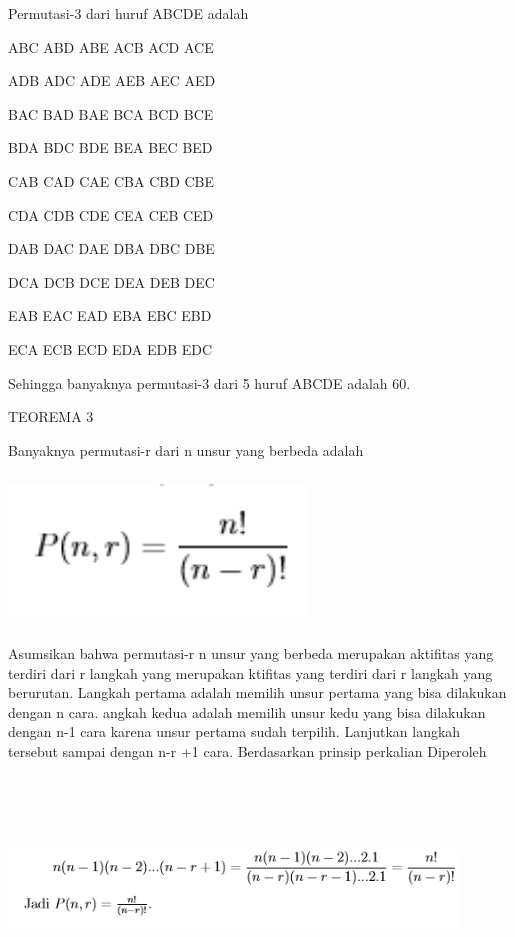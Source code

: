 \documentclass[11pt,fleqn]{book} %
\begin{document}
Permutasi-3 dari huruf ABCDE adalah

ABC ABD ABE ACB ACD ACE 

ADB ADC ADE AEB AEC AED

BAC BAD BAE BCA BCD BCE 

BDA BDC BDE BEA BEC BED 

CAB CAD CAE CBA CBD CBE 

CDA CDB CDE CEA CEB CED 

DAB DAC DAE DBA DBC DBE 

DCA DCB DCE DEA DEB DEC 

EAB EAC EAD EBA EBC EBD 

ECA ECB ECD EDA EDB EDC

Sehingga banyaknya permutasi-3 dari 5 huruf ABCDE adalah 60.


TEOREMA 3

Banyaknya permutasi-r dari n unsur yang berbeda adalah

\includegraphics[width = 8cm, height= 4cm]{Pictures/herlin1.png}

Asumsikan bahwa permutasi-r n unsur yang berbeda merupakan aktifitas yang terdiri dari r langkah yang merupakan ktifitas yang terdiri dari r langkah yang berurutan. Langkah pertama adalah memilih unsur pertama yang bisa dilakukan dengan n cara. angkah kedua adalah memilih unsur kedu yang bisa dilakukan dengan n-1 cara karena unsur pertama sudah terpilih. Lanjutkan langkah tersebut sampai dengan n-r +1 cara. Berdasarkan prinsip perkalian Diperoleh


\includegraphics[width = 12cm, height= 6cm]{Pictures/herlin2.png}
\end{document}
